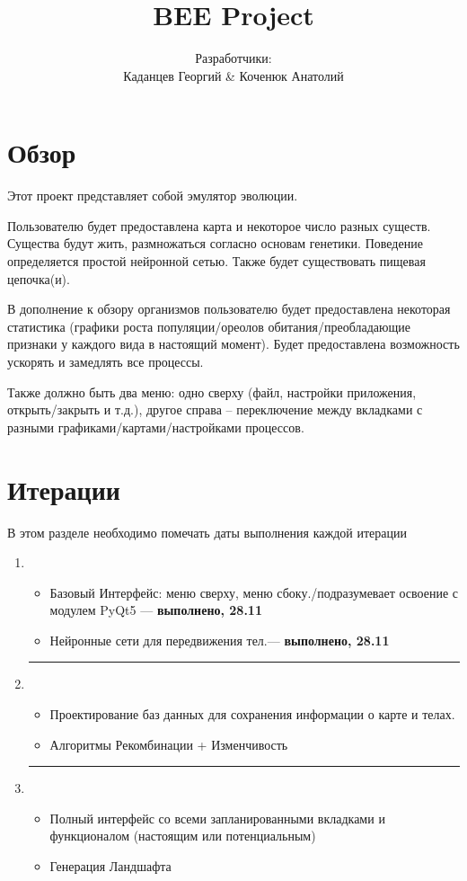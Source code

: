\documentclass[12pt,a4paper, titlepage]{article}
\title{BEE Project}
\author{Разработчики: \\Каданцев Георгий \& Коченюк Анатолий}
\begin{document}
\maketitle
\section{Обзор}

Этот проект представляет собой эмулятор эволюции. 

Пользователю будет предоставлена карта и некоторое число разных существ.
Существа будут жить, размножаться согласно основам генетики. 
Поведение определяется простой нейронной сетью.
Также будет существовать пищевая цепочка(и).

В дополнение к обзору организмов пользователю будет предоставлена некоторая статистика (графики роста популяции/ореолов обитания/преобладающие признаки у каждого вида в настоящий момент). 
Будет предоставлена возможность ускорять и замедлять все процессы. 

Также должно быть два меню: одно сверху (файл, настройки приложения, открыть/закрыть и т.д.), другое справа -- переключение между вкладками с разными графиками/картами/настройками процессов. 
\section{Итерации}
В этом разделе необходимо помечать даты выполнения каждой итерации
\begin{enumerate}
	\item 
	\begin{itemize}
		\item Базовый Интерфейс: меню сверху, меню сбоку./подразумевает освоение с модулем PyQt5 --- \textbf{выполнено, 28.11}
		\item Нейронные сети для передвижения тел.--- \textbf{выполнено, 28.11} 
	\end{itemize}
	\hrule
	\item 
	\begin{itemize}
		\item Проектирование баз данных для сохранения информации о карте и телах.
		\item Алгоритмы Рекомбинации + Изменчивость
	\end{itemize}
	\hrule
	\item 
	\begin{itemize}
		\item Полный интерфейс со всеми запланированными вкладками и функционалом (настоящим или потенциальным)
		\item Генерация Ландшафта
	\end{itemize}
\end{enumerate}
\end{document}
